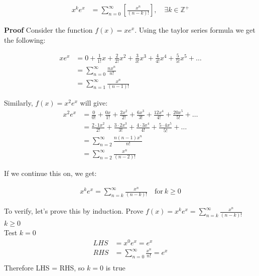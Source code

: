 \documentclass[11pt]{article}
\begin{document}
\begin{enumerate}
\begin{align}
    x^ke^x &= \sum^{\infty}_{n= 0}   {\left[{ \frac{x^n}{{\left({ n- k }\right)}!} }\right]}, \quad \exists k \in \mathbb{Z}^+ \label{eq:uniq-roots-pow-series-ident}
\end{align}

\textbf{Proof}
Consider the function \(f(x) = xe^x\). Using the taylor series formula we get the following:

\begin{align*}
    xe^x &= 0+\frac{1}{1!}x+\frac{2}{2!}x^2+\frac{3}{3!}x^3+\frac{4}{4!}x^4+\frac{5}{5!}x^5+\dots\\
    &= \sum_{n=0}^\infty \frac{nx^n}{n!}\\
    &= \sum_{n=1}^\infty \frac{x^n}{(n-1)!}
\end{align*}

Similarly, \(f(x) = x^2e^x\) will give:
\begin{align*}
    x^2e^x &= \frac{0}{0!} + \frac{0x}{1!} + \frac{2x^2}{2!} + \frac{6x^3}{3!} + \frac{12x^4}{4!} + \frac{20x^5}{5!} + \dots\\
    &= \frac{2\cdot 1x^2}{2!} + \frac{3\cdot 2 x^3}{3!} + \frac{4\cdot 3x^4}{4!} + \frac{5\cdot 4 x^5}{5!} + \dots\\
    &= \sum_{n=2}^\infty \frac{n(n-1)x^n}{n!}\\
    &= \sum_{n=2}^\infty \frac{x^n}{(n-2)!}
\end{align*}

If we continue this on, we get:

\begin{align*}
    x^ke^x = \sum_{n=k}^\infty \frac{x^n}{(n-k)!} \quad \text{for}~k \ge 0
\end{align*}

To verify, let's prove this by induction.
Prove \(f(x) = x^ke^x = \sum_{n=k}^\infty\frac{x^n}{(n-k)!}\)  \(k \ge 0\) \\

Test \(k=0\)
\begin{align*}
    LHS &= x^0e^x = e^x\\
    RHS &= \sum_{n=0}^\infty \frac{x^n}{n!} = e^x\\
\end{align*}
Therefore LHS = RHS, so \(k=0\) is true\\


\end{enumerate}
\end{document}
